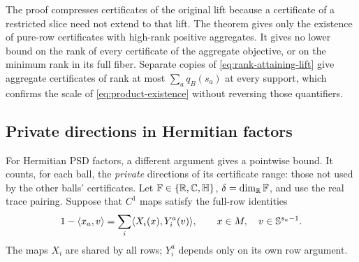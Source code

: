 The proof compresses certificates of the original lift because a
certificate of a restricted slice need not extend to that lift. The
theorem gives only the existence of pure-row certificates with high-rank
positive aggregates. It gives no lower bound on the rank of every
certificate of the aggregate objective, or on the minimum rank in its full
fiber. Separate
copies of \eqref{eq:rank-attaining-lift} give aggregate certificates of
rank at most $\sum_aq_B(s_a)$ at every support, which confirms the scale
of \eqref{eq:product-existence} without reversing those quantifiers.

\subsection{Private directions in Hermitian factors}
For Hermitian PSD factors, a different argument gives a pointwise bound.
It counts, for each ball, the \emph{private} directions of its
certificate range: those not used by the other balls' certificates. Let
$\mathbb F\in\{\mathbb R,\mathbb C,\mathbb H\}$, $\delta=\dim_\mathbb R\mathbb F$, and use the
real trace pairing. Suppose that $C^1$ maps satisfy the full-row
identities
\begin{equation}\label{eq:full-rows}
 1-\langle x_a,v\rangle=\sum_i\langle X_i(x),Y_i^a(v)\rangle,\qquad
 x\in M,\quad v\in\mathbb S^{s_a-1}.
\end{equation}
The maps $X_i$ are shared by all rows; $Y_i^a$ depends only on its own
row argument.

